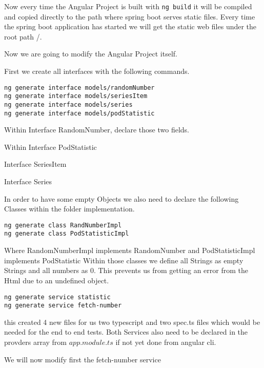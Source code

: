Now every time the Angular Project is built with \texttt{ng build} it will be compiled and copied directly to the path where spring boot serves static files.
Every time the spring boot application has started we will get the static web files under the root path /.

Now we are going to modify the Angular Project itself.

First we create all interfaces with the following commands.
\begin{verbatim}
ng generate interface models/randomNumber
ng generate interface models/seriesItem
ng generate interface models/series
ng generate interface models/podStatistic
\end{verbatim}

Within Interface RandomNumber, declare those two fields.


Within Interface PodStatistic


Interface SeriesItem


Interface Series


In order to have some empty Objects we also need to declare the following Classes within the folder implementation.

\begin{verbatim}
ng generate class RandNumberImpl
ng generate class PodStatisticImpl
\end{verbatim}
Where RandomNumberImpl implements RandomNumber and PodStatisticImpl implements PodStatistic
Within those classes we define all Strings as empty Strings and all numbers as 0.
This prevents us from getting an error from the Html due to an undefined object.

\begin{verbatim}
ng generate service statistic
ng generate service fetch-number
\end{verbatim}
this created 4 new files for us two typescript and two spec.ts files which would be needed for the end to end tests.
Both Services also need to be declared in the provders array from $app.module.ts$ if not yet done from angular cli.

We will now modify first the fetch-number service

